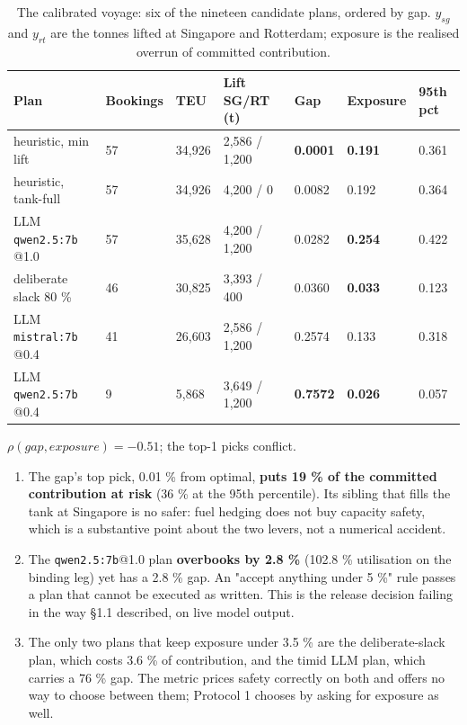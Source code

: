 \documentclass[preprint,12pt,letterpaper]{elsarticle}
\theoremstyle{definition}
\theoremstyle{plain}
\begin{document}
\begin{table}[t]
\centering
\caption{The calibrated voyage: six of the nineteen candidate plans, ordered by gap. $y_{sg}$ and $y_{rt}$ are the tonnes lifted at Singapore and Rotterdam; exposure is the realised overrun of committed contribution.}
\small
\setlength{\tabcolsep}{5pt}
\begin{tabular}{@{}lllllll@{}}
\toprule
Plan & Bookings & TEU & Lift SG/RT (t) & Gap & Exposure & 95th pct \\
\midrule
heuristic, min lift & 57 & 34,926 & 2,586 / 1,200 & \textbf{0.0001} & \textbf{0.191} & 0.361 \\
heuristic, tank-full & 57 & 34,926 & 4,200 / 0 & 0.0082 & 0.192 & 0.364 \\
LLM \texttt{qwen2.5:7b} @1.0 & 57 & 35,628 & 4,200 / 1,200 & 0.0282 & \textbf{0.254} & 0.422 \\
deliberate slack 80 \% & 46 & 30,825 & 3,393 / 400 & 0.0360 & \textbf{0.033} & 0.123 \\
LLM \texttt{mistral:7b} @0.4 & 41 & 26,603 & 2,586 / 1,200 & 0.2574 & 0.133 & 0.318 \\
LLM \texttt{qwen2.5:7b} @0.4 & 9 & 5,868 & 3,649 / 1,200 & \textbf{0.7572} & \textbf{0.026} & 0.057 \\
\bottomrule
\end{tabular}
\end{table}

$\rho(gap, exposure) = -0.51$; the top-1 picks conflict.

\begin{enumerate}
\item The gap's top pick, 0.01 \% from optimal, \textbf{puts 19 \% of the committed contribution at risk} (36 \% at the 95th percentile). Its sibling that fills the tank at Singapore is no safer: fuel hedging does not buy capacity safety, which is a substantive point about the two levers, not a numerical accident.
\item The \texttt{qwen2.5:7b}@1.0 plan \textbf{overbooks by 2.8 \%} (102.8 \% utilisation on the binding leg) yet has a 2.8 \% gap. An "accept anything under 5 \%" rule passes a plan that cannot be executed as written. This is the release decision failing in the way \S 1.1 described, on live model output.
\item The only two plans that keep exposure under 3.5 \% are the deliberate-slack plan, which costs 3.6 \% of contribution, and the timid LLM plan, which carries a 76 \% gap. The metric prices safety correctly on both and offers no way to choose between them; Protocol 1 chooses by asking for exposure as well.
\end{enumerate}
\end{document}

